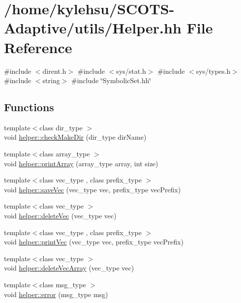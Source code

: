 \hypertarget{Helper_8hh}{}\section{/home/kylehsu/\+S\+C\+O\+T\+S-\/\+Adaptive/utils/\+Helper.hh File Reference}
\label{Helper_8hh}
{\ttfamily \#include $<$dirent.\+h$>$}\newline
{\ttfamily \#include $<$sys/stat.\+h$>$}\newline
{\ttfamily \#include $<$sys/types.\+h$>$}\newline
{\ttfamily \#include $<$string$>$}\newline
{\ttfamily \#include \char`\"{}Symbolic\+Set.\+hh\char`\"{}}\newline
\subsection*{Functions}
\begin{DoxyCompactItemize}
\item 
{\footnotesize template$<$class dir\+\_\+type $>$ }\\void \hyperlink{Helper_8hh_a54c684ce784017d4c61e9fc7a179be67}{helper\+::check\+Make\+Dir} (dir\+\_\+type dir\+Name)
\item 
{\footnotesize template$<$class array\+\_\+type $>$ }\\void \hyperlink{Helper_8hh_ad3a9b9a5d8b46962dae72719f691201c}{helper\+::print\+Array} (array\+\_\+type array, int size)
\item 
{\footnotesize template$<$class vec\+\_\+type , class prefix\+\_\+type $>$ }\\void \hyperlink{Helper_8hh_afea778bfb31cba93e003c382413c36b2}{helper\+::save\+Vec} (vec\+\_\+type vec, prefix\+\_\+type vec\+Prefix)
\item 
{\footnotesize template$<$class vec\+\_\+type $>$ }\\void \hyperlink{Helper_8hh_a4cfbf4be07fc1d320df3c06ab77ff469}{helper\+::delete\+Vec} (vec\+\_\+type vec)
\item 
{\footnotesize template$<$class vec\+\_\+type , class prefix\+\_\+type $>$ }\\void \hyperlink{Helper_8hh_a33cb7ae024bddfc7874b8aaa80d46f4b}{helper\+::print\+Vec} (vec\+\_\+type vec, prefix\+\_\+type vec\+Prefix)
\item 
{\footnotesize template$<$class vec\+\_\+type $>$ }\\void \hyperlink{Helper_8hh_a204cd701ae182be7b10e2017e259285b}{helper\+::delete\+Vec\+Array} (vec\+\_\+type vec)
\item 
{\footnotesize template$<$class msg\+\_\+type $>$ }\\void \hyperlink{Helper_8hh_a8511b1f612df58fa2d54b823cf6c1f7a}{helper\+::error} (msg\+\_\+type msg)
\end{DoxyCompactItemize}


